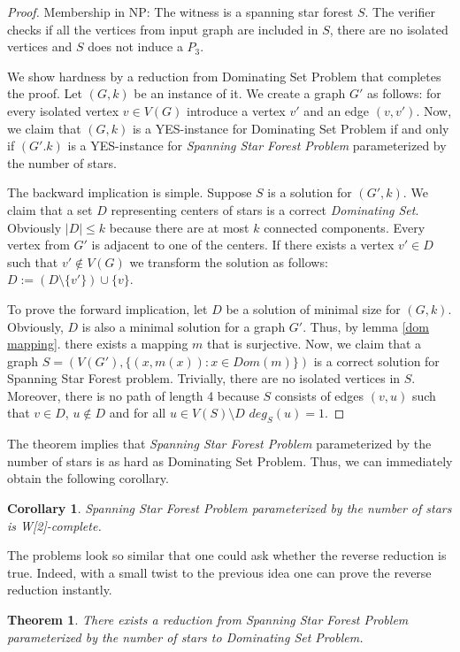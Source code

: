 \documentclass[en]{pracamgr}
\newtheorem{theorem}{Theorem}
\newtheorem{corollary}{Corollary}
\newcommand{\ssfp}{{\sc Spanning Star Forest} problem}
\newcommand{\domset}{\emph{Dominating Set}}
\newcommand{\domsetp}{{\sc Dominating Set Problem}}
\newcommand{\kssf}{\emph{Spanning Star Forest Problem} parameterized by the number of stars}
\begin{document}
\begin{proof}
	Membership in NP: The witness is a spanning star forest $S$. The verifier checks if all the vertices from input graph are included in $S$, there are no isolated vertices and $S$ does not induce a $P_3$. 
	
	We show hardness by a reduction from \domsetp{} that completes the proof. Let $(G,k)$ be an instance of it. We create a graph	$G'$ as follows: for every isolated vertex $v \in V(G)$ introduce a vertex $v'$ and an edge $(v,v')$. Now, we claim that $(G,k)$ is a YES-instance for \domsetp{} if and only if $(G'.k)$ is a YES-instance for \kssf{}. 
	
	The backward implication is simple. Suppose $S$ is a solution for $(G',k)$. We claim that a set $D$ representing centers of stars is a correct \domset{}. Obviously $|D| \leq k$ because there are at most $k$ connected components. Every vertex from $G'$ is adjacent to one of the centers. If there exists a vertex $v' \in D$ such that $v' \notin V(G)$ we transform the solution as follows: $D := (D \setminus \{v'\})\cup \{v\}$. 
	
	To prove the forward implication, let $D$ be a solution of minimal size for $(G,k)$. Obviously, $D$ is also a minimal solution for a graph $G'$. Thus, by lemma \ref{dom mapping}. there exists a mapping $m$ that is surjective. Now, we claim that a graph $S=(V(G'),\{(x,m(x)): x \in Dom(m)\})$ is a correct solution for \ssfp{}. Trivially, there are no isolated vertices in $S$. Moreover, there is no path of length 4 because $S$ consists of edges $(v,u)$ such that $v \in D$, $u \notin D$ and for all $u \in V(S) \setminus D$ $deg_S(u)=1$.
	
\end{proof}

The theorem implies that \kssf{} is as hard as \domsetp{}. Thus, we can immediately obtain the following corollary.

\begin{corollary}
	\kssf{} is {\normalfont W[2]-complete}.
\end{corollary}

The problems look so similar that one could ask whether the reverse reduction is true. Indeed, with a small twist to the previous idea one can prove the reverse reduction instantly.  

\begin{theorem}\label{ssf dom}
	There exists a reduction from \kssf{} to \domsetp{}.
\end{theorem}
\end{document}
